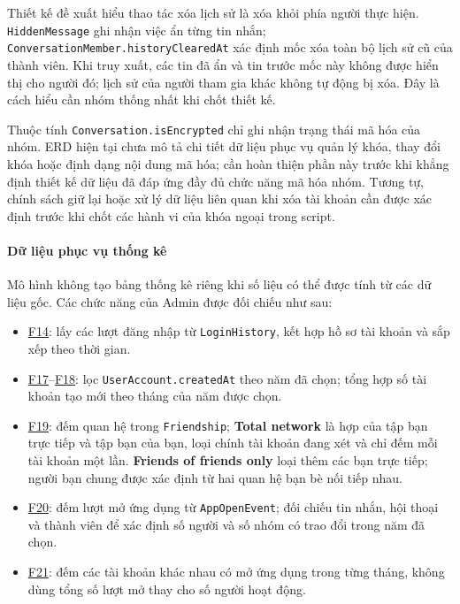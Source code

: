 Thiết kế đề xuất hiểu thao tác xóa lịch sử là xóa khỏi phía người thực hiện.
\texttt{HiddenMessage} ghi nhận việc ẩn từng tin nhắn;
\texttt{ConversationMember.historyClearedAt} xác định mốc xóa toàn bộ lịch sử
cũ của thành viên. Khi truy xuất, các tin đã ẩn và tin trước mốc này
không được hiển thị cho người đó; lịch sử của người tham gia khác không
tự động bị xóa. Đây là cách hiểu cần nhóm thống nhất khi chốt thiết kế.

Thuộc tính \texttt{Conversation.isEncrypted} chỉ ghi nhận trạng thái mã hóa
của nhóm. ERD hiện tại chưa mô tả chi tiết dữ liệu phục vụ quản lý khóa,
thay đổi khóa hoặc định dạng nội dung mã hóa; cần hoàn thiện phần này trước
khi khẳng định thiết kế dữ liệu đã đáp ứng đầy đủ chức năng mã hóa nhóm.
Tương tự, chính sách giữ lại hoặc xử lý dữ liệu liên quan khi xóa tài khoản
cần được xác định trước khi chốt các hành vi của khóa ngoại trong script.

\paragraph{Dữ liệu phục vụ thống kê}
\mbox{}\par

Mô hình không tạo bảng thống kê riêng khi số liệu có thể được tính từ
các dữ liệu gốc. Các chức năng của Admin được đối chiếu như sau:

\begin{itemize}
  \item \hyperlink{F14}{F14}: lấy các lượt đăng nhập từ
    \texttt{LoginHistory}, kết hợp hồ sơ tài khoản và sắp xếp theo thời gian.
  \item \hyperlink{F17}{F17}--\hyperlink{F18}{F18}: lọc
    \texttt{UserAccount.createdAt} theo năm đã chọn; tổng hợp số tài khoản
    tạo mới theo tháng của năm được chọn.
  \item \hyperlink{F19}{F19}: đếm quan hệ trong \texttt{Friendship};
    \textbf{Total network} là hợp của tập bạn trực tiếp và tập bạn của bạn,
    loại chính tài khoản đang xét và chỉ đếm mỗi tài khoản một lần.
    \textbf{Friends of friends only} loại thêm các bạn trực tiếp; người bạn
    chung được xác định từ hai quan hệ bạn bè nối tiếp nhau.
  \item \hyperlink{F20}{F20}: đếm lượt mở ứng dụng từ
    \texttt{AppOpenEvent}; đối chiếu tin nhắn, hội thoại và thành viên để
    xác định số người và số nhóm có trao đổi trong năm đã chọn.
  \item \hyperlink{F21}{F21}: đếm các tài khoản khác nhau có mở ứng dụng
    trong từng tháng, không dùng tổng số lượt mở thay cho số người hoạt động.
\end{itemize}

